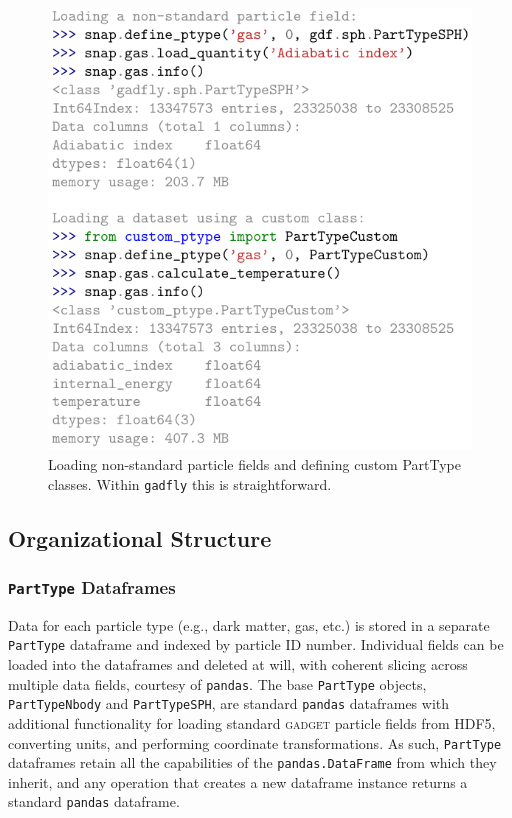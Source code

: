 \documentclass{emulateapj}
\newcommand{\code}[1]{\texttt{#1}}
\begin{document}
\begin{figure}[h!]
\begin{center}
\includegraphics[width=0.98\columnwidth]{figures/code_custom_ptypes/code_custom_ptypes}
\caption{\label{fig:custom_ptype}
Loading non-standard particle fields and defining custom PartType classes. Within \code{gadfly} this is straightforward.%
}
\end{center}
\end{figure}

\subsection{Organizational Structure}
\label{sec:hierarchy}

\subsubsection{\code{PartType} Dataframes}
\label{sec:df}
Data for each particle type (e.g., dark matter, gas, etc.) is stored in a separate \code{PartType} dataframe and indexed by particle ID number. 
Individual fields can be loaded into the dataframes and deleted at will, with coherent slicing across multiple data fields, courtesy of \code{pandas}.  
The base \code{PartType} objects, \code{PartTypeNbody} and \code{PartTypeSPH}, are standard \code{pandas} dataframes with additional functionality for loading standard \textsc{gadget} particle fields from HDF5, converting units, and performing coordinate transformations.  
As such, \code{PartType} dataframes retain all the capabilities of the \code{pandas.DataFrame} from which they inherit, and any operation that creates a new dataframe instance returns a standard \code{pandas} dataframe.  
\end{document}
